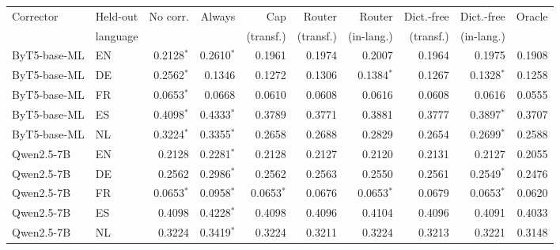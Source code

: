 \begin{tabular}{llrrrrrrrr}
\toprule
Corrector & Held-out & No corr. & Always & Cap & Router & Router & Dict.-free & Dict.-free & Oracle \\
 & language & & & (transf.) & (transf.) & (in-lang.) & (transf.) & (in-lang.) & \\
\midrule
ByT5-base-ML & EN & 0.2128$^{*}$ & 0.2610$^{*}$ & 0.1961 & 0.1974 & 0.2007 & 0.1964 & 0.1975 & 0.1908 \\
ByT5-base-ML & DE & 0.2562$^{*}$ & 0.1346 & 0.1272 & 0.1306 & 0.1384$^{*}$ & 0.1267 & 0.1328$^{*}$ & 0.1258 \\
ByT5-base-ML & FR & 0.0653$^{*}$ & 0.0668 & 0.0610 & 0.0608 & 0.0616 & 0.0608 & 0.0616 & 0.0555 \\
ByT5-base-ML & ES & 0.4098$^{*}$ & 0.4333$^{*}$ & 0.3789 & 0.3771 & 0.3881 & 0.3777 & 0.3897$^{*}$ & 0.3707 \\
ByT5-base-ML & NL & 0.3224$^{*}$ & 0.3355$^{*}$ & 0.2658 & 0.2688 & 0.2829 & 0.2654 & 0.2699$^{*}$ & 0.2588 \\
Qwen2.5-7B & EN & 0.2128 & 0.2281$^{*}$ & 0.2128 & 0.2127 & 0.2120 & 0.2131 & 0.2127 & 0.2055 \\
Qwen2.5-7B & DE & 0.2562 & 0.2986$^{*}$ & 0.2562 & 0.2563 & 0.2550 & 0.2561 & 0.2549$^{*}$ & 0.2476 \\
Qwen2.5-7B & FR & 0.0653$^{*}$ & 0.0958$^{*}$ & 0.0653$^{*}$ & 0.0676 & 0.0653$^{*}$ & 0.0679 & 0.0653$^{*}$ & 0.0620 \\
Qwen2.5-7B & ES & 0.4098 & 0.4228$^{*}$ & 0.4098 & 0.4096 & 0.4104 & 0.4096 & 0.4091 & 0.4033 \\
Qwen2.5-7B & NL & 0.3224 & 0.3419$^{*}$ & 0.3224 & 0.3211 & 0.3224 & 0.3213 & 0.3221 & 0.3148 \\
\bottomrule
\end{tabular}
